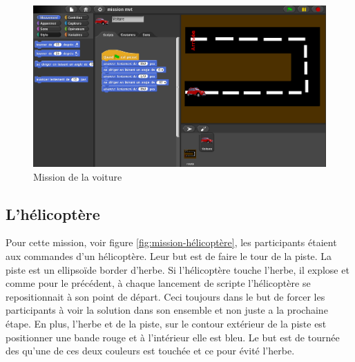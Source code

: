 \begin{figure}[ht]
  \begin{center}
    \includegraphics[scale=0.35]{content/7-solution/1-missions/images/voiture}
    \caption{Mission de la voiture}
    \label{fig:mission-voiture}
  \end{center}
\end{figure}


\subsection{L'hélicoptère}
\label{mission-helicoptere}
Pour cette mission, voir figure \ref{fig:mission-hélicoptère}, les participants étaient aux commandes d'un hélicoptère. Leur but est de faire le tour de la piste. La piste est un ellipsoïde border d'herbe. Si l'hélicoptère touche l'herbe, il explose et comme pour le précédent, à chaque lancement de scripte l'hélicoptère se repositionnait à son point de départ. Ceci toujours dans le but de forcer les participants à voir la solution dans son ensemble et non juste a la prochaine étape. En plus, l'herbe et de la piste, sur le contour extérieur de la piste est positionner une bande rouge et à l'intérieur elle est bleu. Le but est de tournée des qu'une de ces deux couleurs est touchée et ce pour évité l'herbe.\\

